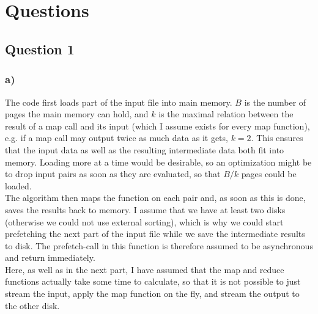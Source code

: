 \documentclass[12pt,a4paper,fleqn]{article}
\begin{document}
\title{\Module\\\Uebung}
\author{\Studentenname}
\maketitle

\section*{Questions} 
\label{sec:questions}

\subsection*{Question 1}
\label{sec:qq1}

\subsubsection*{a)}
\begin{algorithm}[H]



\end{algorithm}

The code first loads part of the input file into main memory. $B$ is the number of pages the main memory can hold, and $k$ is the maximal relation between the result of a map call and its input (which I assume exists for every map function), e.g. if a map call may output twice as much data as it gets, $k=2$. This ensures that the input data as well as the resulting intermediate data both fit into memory. Loading more at a time would be desirable, so an optimization might be to drop input pairs as soon as they are evaluated, so that $B/k$ pages could be loaded. \\The algorithm then maps the function on each pair and, as soon as this is done, saves the results back to memory. I assume that we have at least two disks (otherwise we could not use external sorting), which is why we could start prefetching the next part of the input file while we save the intermediate results to disk. The prefetch-call in this function is therefore assumed to be asynchronous and return immediately. \\Here, as well as in the next part, I have assumed that the map and reduce functions actually take some time to calculate, so that it is not possible to just stream the input, apply the map function on the fly, and stream the output to the other disk.
\end{document}
